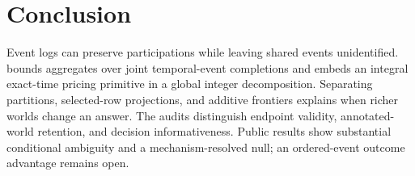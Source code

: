 \section{Conclusion}
Event logs can preserve participations while leaving shared events unidentified.
\methodname{} bounds aggregates over joint temporal-event completions and embeds
an integral exact-time pricing primitive in a global integer decomposition.
Separating partitions, selected-row projections, and additive frontiers explains
when richer worlds change an answer. The audits distinguish endpoint validity,
annotated-world retention, and decision informativeness. Public results show
substantial conditional ambiguity and a mechanism-resolved null; an
ordered-event outcome advantage remains open.
